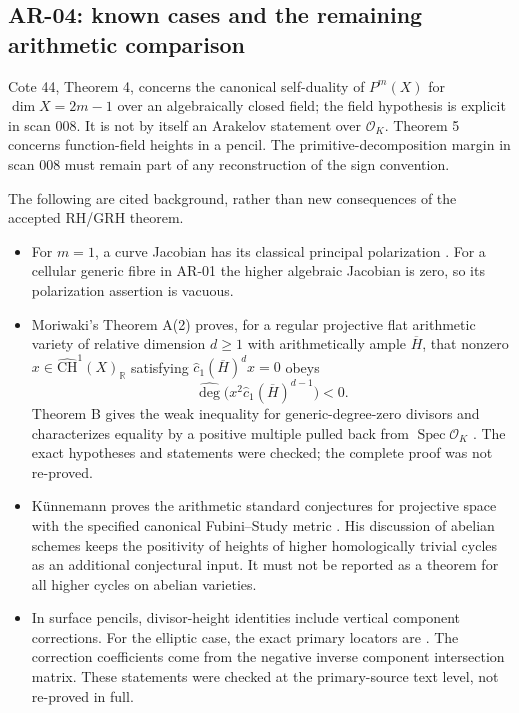 \documentclass[11pt,a4paper]{article}
\theoremstyle{remark}
\begin{document}
\subsection{AR-04: known cases and the remaining arithmetic comparison}
\label{ar:known}

Cote 44, Theorem 4, concerns the canonical self-duality of $P^m(X)$ for
$\dim X=2m-1$ over an algebraically closed field; the field hypothesis is
explicit in scan 008.  It is not by itself an Arakelov statement over
$\mathcal O_K$.  Theorem 5 concerns function-field heights in a pencil.
The primitive-decomposition margin in scan 008 must remain part of any
reconstruction of the sign convention.

The following are cited background, rather than new consequences of the
accepted RH/GRH theorem.
\begin{itemize}
\item For $m=1$, a curve Jacobian has its classical principal polarization
\cite[Theorem 6.6 and Summary 6.11]{MilneJacobian}.
For a cellular generic fibre in AR-01 the higher algebraic Jacobian is zero,
so its polarization assertion is vacuous.
\item Moriwaki's Theorem A(2) proves, for a regular projective flat
arithmetic variety of relative dimension $d\ge1$ with arithmetically ample
$\overline H$, that nonzero $x\in\widehat{\mathrm{CH}}^1(X)_{\mathbb R}$
satisfying $\widehat c_1(\overline H)^d x=0$ obeys
\[
 \widehat{\deg}\bigl(x^2\widehat c_1(\overline H)^{d-1}\bigr)<0.
\]
Theorem B gives the weak inequality for generic-degree-zero divisors and
characterizes equality by a positive multiple pulled back from
$\operatorname{Spec}\mathcal O_K$ \cite[Theorems A and B]{Moriwaki}.
The exact hypotheses and statements were checked; the complete proof was
not re-proved.
\item K\"unnemann proves the arithmetic standard conjectures for projective
space with the specified canonical Fubini--Study metric
\cite[Theorem 4.1]{Kunnemann}.  His discussion of abelian schemes keeps
the positivity of heights of higher homologically trivial cycles as an
additional conjectural input.  It must not be reported as a theorem for all
higher cycles on abelian varieties.
\item In surface pencils, divisor-height identities include vertical
component corrections.  For the elliptic case, the exact primary locators
are \cite[Lemma 8.1, Theorems 8.4 and 8.6, equations (8.8), (8.11)--(8.14)]{Shioda}.
The correction coefficients come from the negative inverse component
intersection matrix.  These statements were checked at the primary-source
text level, not re-proved in full.
\end{itemize}
\end{document}
